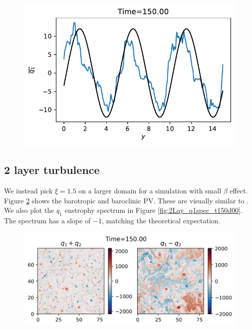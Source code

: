 \begin{figure}
    \centering
    \includegraphics{plot_snap/figs/2Layjets_q1zonalmean_t150d00}
    \caption{}
    \label{fig:2Layjets_q1zonalmean_t150d00}
\end{figure}

\subsection{2 layer turbulence}
We instead pick $\xi=1.5$ on a larger domain for a simulation with small $\beta$ effect. Figure \ref{fig:2Lay_qbrbc_t150d00} shows the barotropic and baroclinic PV. These are visually similar to \cite[Fig. 3]{LarichevHeld_95}. We also plot the $q_1$ enstrophy spectrum in Figure \ref{fig:2Lay_q1spec_t150d00}. The spectrum has a slope of $-1$, matching the theoretical expectation.

\begin{figure}
    \centering
    \includegraphics{plot_snap/figs/2Lay_qbrbc_t150d00}
    \caption{}
    \label{fig:2Lay_qbrbc_t150d00}
\end{figure}

